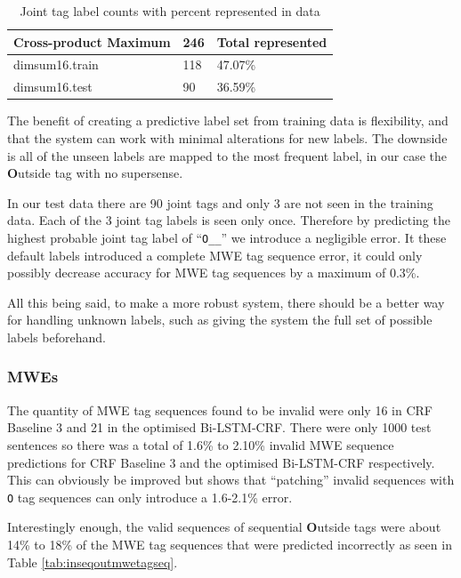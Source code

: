 \begin{table}[H]
    \centering
    \begin{tabular}{l|l|l}
      Cross-product Maximum & 246 & {\bf Total represented}\\
      \hline
      dimsum16.train & 118 & 47.07\%\\ 
      dimsum16.test & 90 & 36.59\%\\ 
    \end{tabular}
  \caption{Joint tag label counts with percent represented in data}
  \label{tab:jointtagcountsrepresented}
\end{table}

The benefit of creating a predictive label set from training data is flexibility, and that the system can work with minimal alterations for new labels. The downside is all of the unseen labels are mapped to the most frequent label, in our case the {\bf O}utside tag with no supersense.  

In our test data there are 90 joint tags and only 3 are not seen in the training data. Each of the 3 joint tag labels is seen only once. Therefore by predicting the highest probable joint tag label of ``\texttt{O\_\_}'' we introduce a negligible error. It these default labels introduced a complete MWE tag sequence error, it could only possibly decrease accuracy for MWE tag sequences by a maximum of 0.3\%.

All this being said, to make a more robust system, there should be a better way for handling unknown labels, such as giving the system the full set of possible labels beforehand. 

\subsubsection{MWEs}\label{pitfallsmwes}

The quantity of MWE tag sequences found to be invalid were only 16 in CRF Baseline 3 and 21 in the optimised Bi-LSTM-CRF. There were only 1000 test sentences so there was a total of 1.6\% to 2.10\% invalid MWE sequence predictions for CRF Baseline 3 and the optimised Bi-LSTM-CRF respectively. This can obviously be improved but shows that ``patching'' invalid sequences with \texttt{O} tag sequences can only introduce a 1.6-2.1\% error.

Interestingly enough, the valid sequences of sequential {\bf O}utside tags were about 14\% to 18\% of the MWE tag sequences that were predicted incorrectly as seen in Table \ref{tab:inseqoutmwetagseq}. 


